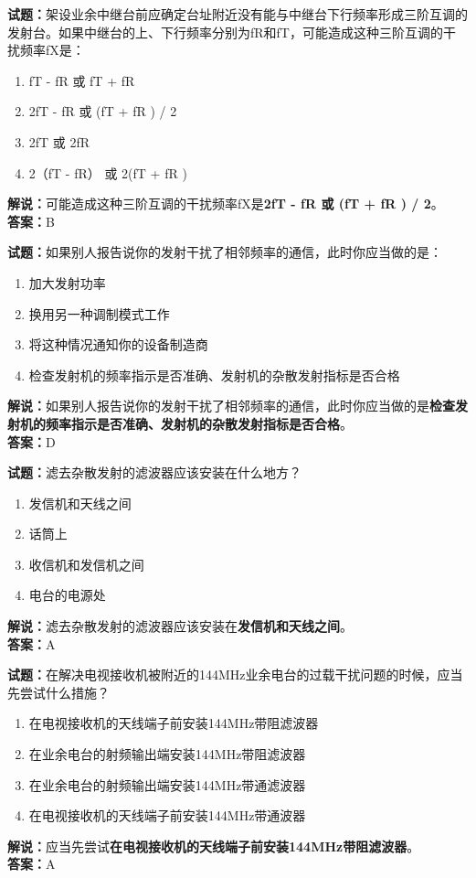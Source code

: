 \documentclass{ctexbook}
\begin{document}
\noindent\textbf{试题：}架设业余中继台前应确定台址附近没有能与中继台下行频率形成三阶互调的发射台。如果中继台的上、下行频率分别为fR和fT，可能造成这种三阶互调的干扰频率fX是：
\begin{enumerate}[leftmargin=3em]
\item fT - fR 或 fT + fR
\item 2fT - fR 或 (fT + fR ) / 2
\item 2fT 或 2fR
\item 2（fT - fR） 或 2(fT + fR )
\end{enumerate}
\noindent\textbf{解说：}可能造成这种三阶互调的干扰频率fX是\textbf{2fT - fR 或 (fT + fR ) / 2}。\\\noindent\textbf{答案：}B



\bigskip


\noindent\textbf{试题：}如果别人报告说你的发射干扰了相邻频率的通信，此时你应当做的是：
\begin{enumerate}[leftmargin=3em]
\item 加大发射功率
\item 换用另一种调制模式工作
\item 将这种情况通知你的设备制造商
\item 检查发射机的频率指示是否准确、发射机的杂散发射指标是否合格
\end{enumerate}
\noindent\textbf{解说：}如果别人报告说你的发射干扰了相邻频率的通信，此时你应当做的是\textbf{检查发射机的频率指示是否准确、发射机的杂散发射指标是否合格}。\\\noindent\textbf{答案：}D



\bigskip


\noindent\textbf{试题：}滤去杂散发射的滤波器应该安装在什么地方？
\begin{enumerate}[leftmargin=3em]
\item 发信机和天线之间
\item 话筒上
\item 收信机和发信机之间
\item 电台的电源处
\end{enumerate}
\noindent\textbf{解说：}滤去杂散发射的滤波器应该安装在\textbf{发信机和天线之间}。\\\noindent\textbf{答案：}A


\bigskip


\noindent\textbf{试题：}在解决电视接收机被附近的144MHz业余电台的过载干扰问题的时候，应当先尝试什么措施？
\begin{enumerate}[leftmargin=3em]
\item 在电视接收机的天线端子前安装144MHz带阻滤波器
\item 在业余电台的射频输出端安装144MHz带阻滤波器
\item 在业余电台的射频输出端安装144MHz带通滤波器
\item 在电视接收机的天线端子前安装144MHz带通波器
\end{enumerate}
\noindent\textbf{解说：}应当先尝试\textbf{在电视接收机的天线端子前安装144MHz带阻滤波器}。\\\noindent\textbf{答案：}A
\end{document}
